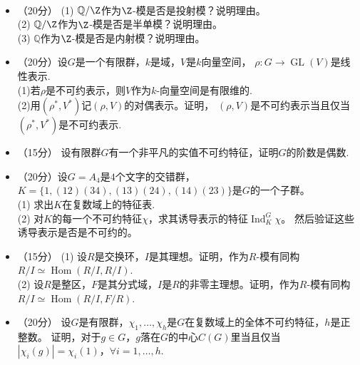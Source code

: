 ~\\
\begin{center}
\end{center}
\begin{itemize}
\item[1.]（20分）
(1) $\mathbb{Q}/\Z$作为$\Z$-模是否是投射模？说明理由。\\
(2) $\mathbb{Q}/\Z$作为$\Z$-模是否是半单模？说明理由。\\
(3) $\mathbb{Q}$作为$\Z$-模是否是内射模？说明理由。

\item[2.]（20分）设$G$是一个有限群，$k$是域，$V$是$k$向量空间，
$\rho:G\rightarrow \operatorname*{GL}(V)$是线性表示. \\
(1)若$\rho$是不可约表示，则$V$作为$k$-向量空间是有限维的.\\
(2)用$(\rho^{*},V^{*})$记$(\rho,V)$的对偶表示。证明，
$(\rho,V)$是不可约表示当且仅当$(\rho^{*},V^{*})$是不可约表示.

\item[3.]（15分）
设有限群$G$有一个非平凡的实值不可约特征，证明$G$的阶数是偶数.

\item[4.]（20分）设$G=A_4$是$4$个文字的交错群，$K=\{1,(12)(34),(13)(24),(14)(23)\}$是$G$的一个子群。\\
(1) 求出$K$在复数域上的特征表.\\
(2) 对$K$的每一个不可约特征$\chi$，求其诱导表示的特征$\operatorname{Ind}_K^G\chi$。
然后验证这些诱导表示是否是不可约的。

\item[5.]（15分）
(1) 设$R$是交换环，$I$是其理想。证明，作为$R$-模有同构$R/I\simeq\operatorname{Hom}(R/I,R/I)$.\\
(2) 设$R$是整区，$F$是其分式域，$I$是$R$的非零主理想。证明，作为$R$-模有同构$R/I\simeq\operatorname{Hom}(R/I,F/R)$.

\item[6.]（20分）
设$G$是有限群，$\chi_1,\dots,\chi_h$是$G$在复数域上的全体不可约特征，$h$是正整数。
证明，对于$g\in G$，$g$落在$G$的中心$C(G)$里当且仅当
$|\chi_i(g)|=\chi_i(1)$，$\forall i=1,\dots,h$.
\end{itemize}